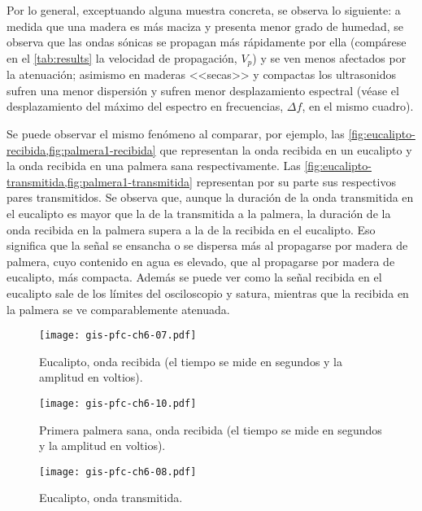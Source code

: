 Por lo general, exceptuando alguna muestra concreta, se observa lo
siguiente: a medida que una madera es más maciza y presenta menor grado de
humedad, se observa que las ondas sónicas se propagan más rápidamente por
ella (compárese en el \cref{tab:results} la velocidad de propagación,
$V_{p}$) y se ven menos afectados por la atenuación; asimismo en maderas
<<secas>> y compactas los ultrasonidos sufren una menor dispersión y sufren
menor desplazamiento espectral (véase el desplazamiento del máximo del
espectro en frecuencias, $\Delta f$, en el mismo cuadro).

Se puede observar el mismo fenómeno al comparar, por ejemplo, las
\cref{fig:eucalipto-recibida,fig:palmera1-recibida} que representan la onda
recibida en un eucalipto y la onda recibida en una palmera sana
respectivamente. Las
\cref{fig:eucalipto-transmitida,fig:palmera1-transmitida} representan por
su parte sus respectivos pares transmitidos. Se observa que, aunque la
duración de la onda transmitida en el eucalipto es mayor que la de la
transmitida a la palmera, la duración de la onda recibida en la palmera
supera a la de la recibida en el eucalipto. Eso significa que la señal se
ensancha o se dispersa más al propagarse por madera de palmera, cuyo
contenido en agua es elevado, que al propagarse por madera de eucalipto,
más compacta. Además se puede ver como la señal recibida en el eucalipto
sale de los límites del osciloscopio y satura, mientras que la recibida en
la palmera se ve comparablemente atenuada.

\begin{figure}
    \begin{center}
	\texttt{[image: gis-pfc-ch6-07.pdf]}
    \end{center}
    \caption[Eucalipto (onda recibida)]{Eucalipto, onda recibida (el tiempo
    se mide en segundos y la amplitud en voltios).}
    \label{fig:eucalipto-recivida}
\end{figure}

\begin{figure}
    \begin{center}
	\texttt{[image: gis-pfc-ch6-10.pdf]}
    \end{center}
    \caption[Primera palmera sana (onda recibida)]{Primera palmera sana,
    onda recibida (el tiempo se mide en segundos y la amplitud en
    voltios).}
    \label{fig:palmera1-recivida}
\end{figure}

\begin{figure}
    \begin{center}
	\texttt{[image: gis-pfc-ch6-08.pdf]}
    \end{center}
    \caption[Eucalipto (onda transmitida)]{Eucalipto, onda transmitida.}
    \label{fig:eucalipto-transmitida}
\end{figure}

